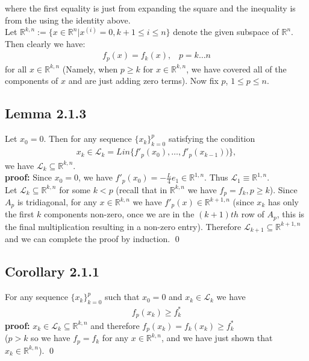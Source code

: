 \documentclass[12pt,a4paper]{article}
\begin{document}
	where the first equality is just from expanding the square and the inequality is from the using the identity above.\\
	Let $\mathbb{R}^{k,n} := \{x \in \mathbb{R}^n | x^{(i)} = 0, k+1 \leq i \leq n\}$ denote the given subspace of $\mathbb{R}^n$. Then clearly we have:
	\begin{align*}
		f_p(x) = f_k(x), \hspace{10pt} p = k \ldots n
	\end{align*} 
	for all $x \in \mathbb{R}^{k,n}$ (Namely, when $p \geq k$ for $x \in \mathbb{R}^{k,n}$, we have covered all of the components of $x$ and are just adding zero terms). Now fix $p$, $1 \leq p \leq n$.
	\subsection*{Lemma 2.1.3}\label{lem213}
	Let $x_0 = 0$. Then for any sequence $\{x_k\}_{k=0}^{p}$ satisfying the condition 
	\begin{align*}
		x_k \in \mathcal{L}_k = Lin \{f'_p(x_0), \ldots , f'_p(x_{k-1}))\},
	\end{align*}
	we have $\mathcal{L}_k \subseteq \mathbb{R}^{k,n}$. \\
	\textbf{proof:} Since $x_0 = 0$, we have $f'_p(x_0) = - \frac{L}{4}e_1 \in \mathbb{R}^{1,n}$. Thus $\mathcal{L}_1 \equiv \mathbb{R}^{1,n}$. \\
	Let $\mathcal{L}_k \subseteq \mathbb{R}^{k,n}$ for some $k < p$ (recall that in $\mathbb{R}^{k,n}$ we have $f_p = f_k, p \geq k$). Since $A_p$ is tridiagonal, for any $x \in \mathbb{R}^{k,n}$ we have $f'_p(x) \in \mathbb{R}^{k+1,n}$ (since $x_k$ has only the first $k$ components non-zero, once we are in the $(k+1)th$ row of $A_p$, this is the final multiplication resulting in a non-zero entry). Therefore $\mathcal{L}_{k+1} \subseteq \mathbb{R}^{k+1,n}$ and we can complete the proof by induction. \qed \\
	\subsection*{Corollary 2.1.1}\label{cor211}
	For any sequence $\{x_k\}_{k=0}^p$ such that $x_0 = 0$ and $x_k \in \mathcal{L}_k$ we have
	\begin{align*}
		f_p(x_k) \geq f_k^*
	\end{align*}	
	\textbf{proof:} $x_k \in \mathcal{L}_k \subseteq \mathbb{R}^{k,n}$ and therefore $f_p(x_k) = f_k(x_k) \geq f_k^*$ \\
	($p > k$ so we have $f_p = f_k$ for any $x \in \mathbb{R}^{k,n}$, and we have just shown that $x_k \in \mathbb{R}^{k,n}$). \qed \\
\end{document}
